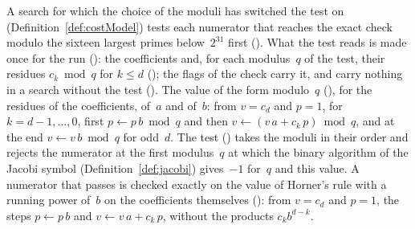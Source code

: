 \begin{definition}\label{def:modTest}
  \leanok
  A search for which the choice of the moduli has switched the test on
  (Definition~\ref{def:costModel}) tests each numerator that reaches the exact check modulo the
  sixteen largest primes below~$2^{31}$ first (). What the test
  reads is made once for the run (): the coefficients and, for
  each modulus~$q$ of the test, their residues $c_k \bmod q$ for $k \le d$
  (); the flags of the check carry it, and carry nothing in a
  search without the test (). The value of the form modulo~$q$
  (), for the residues of the coefficients, of~$a$ and of~$b$:
  from $v = c_d$ and $p = 1$, for $k = d - 1, \dots, 0$, first $p \leftarrow p\,b \bmod q$ and then
  $v \leftarrow (v\,a + c_k\,p) \bmod q$, and at the end $v \leftarrow v\,b \bmod q$ for odd~$d$.
  The test () takes the moduli in their order and rejects the
  numerator at the first modulus~$q$ at which the binary algorithm of the Jacobi symbol
  (Definition~\ref{def:jacobi}) gives~$-1$ for~$q$ and this value. A numerator that passes is
  checked exactly on the value of Horner's rule with a running power of~$b$ on the coefficients
  themselves (): from $v = c_d$ and $p = 1$, the steps
  $p \leftarrow p\,b$ and $v \leftarrow v\,a + c_k\,p$, without the products $c_k b^{d - k}$.
\end{definition}

